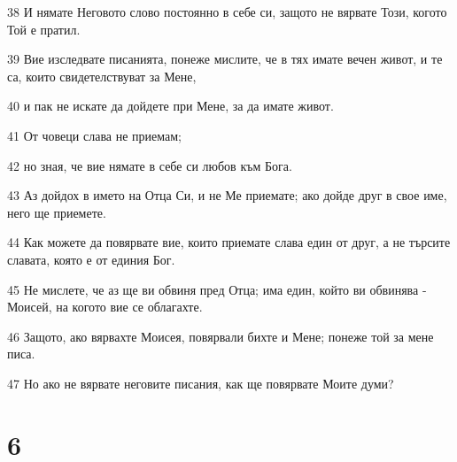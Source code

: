 \par 38 И нямате Неговото слово постоянно в себе си, защото не вярвате Този, когото Той е пратил.
\par 39 Вие изследвате писанията, понеже мислите, че в тях имате вечен живот, и те са, които свидетелствуват за Мене,
\par 40 и пак не искате да дойдете при Мене, за да имате живот.
\par 41 От човеци слава не приемам;
\par 42 но зная, че вие нямате в себе си любов към Бога.
\par 43 Аз дойдох в името на Отца Си, и не Ме приемате; ако дойде друг в свое име, него ще приемете.
\par 44 Как можете да повярвате вие, които приемате слава един от друг, а не търсите славата, която е от единия Бог.
\par 45 Не мислете, че аз ще ви обвиня пред Отца; има един, който ви обвинява - Моисей, на когото вие се облагахте.
\par 46 Защото, ако вярвахте Моисея, повярвали бихте и Мене; понеже той за мене писа.
\par 47 Но ако не вярвате неговите писания, как ще повярвате Моите думи?

\chapter{6}

